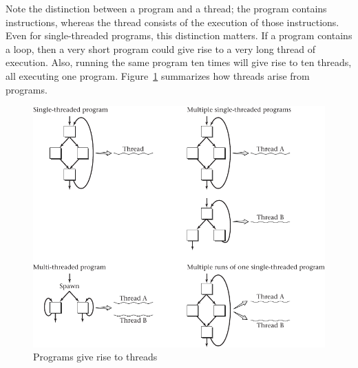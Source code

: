 Note the distinction between a program and a thread; the program
contains instructions, whereas the thread consists of the execution of
those instructions.  Even for single-threaded programs, this
distinction matters.  If a program contains a loop, then a very short
program could give rise to a very long thread of execution.  Also,
running the same program ten times will give rise to ten threads, all
executing one program.  Figure~\ref{scan-2-1} summarizes how threads
arise from programs.
\begin{figure}
\centerline{\includegraphics{hail_f0201}}
\caption{Programs give rise to threads}
\label{scan-2-1}
\end{figure}

